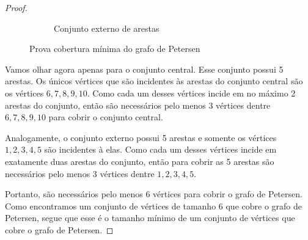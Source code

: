 \documentclass[11pt,a4paper]{exam}
\begin{document}
\begin{proof}
\begin{figure}[H]
\begin{subfigure}{.5\textwidth}
\begin{tikzpicture}[shorten >=0.5pt, auto,
            every node/.style={scale=0.7}, scale=0.7]
        \end{tikzpicture}
        \caption{Conjunto externo de arestas}
    \end{subfigure}
            \caption{Prova cobertura mínima do grafo de Petersen}
\end{figure}
Vamos olhar agora apenas para o conjunto central. Esse conjunto possui 5
arestas. Os únicos vértices que são incidentes às arestas do conjunto
    central são os vértices $6,7,8,9,10$. Como cada um desses vértices
    incide em no máximo 2 arestas do conjunto, então são necessários
    pelo menos 3 vértices dentre $6,7,8,9,10$ para cobrir o conjunto central.\par
    Analogamente, o conjunto externo possui 5 arestas e somente os
    vértices $1,2,3,4,5$ são incidentes à elas. Como cada um desses vértices incide em
    exatamente duas arestas do conjunto, então para cobrir as 5 arestas
    são necessários pelo menos 3 vértices dentre $1,2,3,4,5$.\par
    Portanto, são necessários pelo menos 6 vértices para cobrir o grafo
    de Petersen. Como encontramos um conjunto de vértices de tamanho 6
    que cobre o grafo de Petersen, segue que esse é o tamanho mínimo de
    um conjunto de vértices que cobre o grafo de Petersen.
\end{proof}
\end{document}
